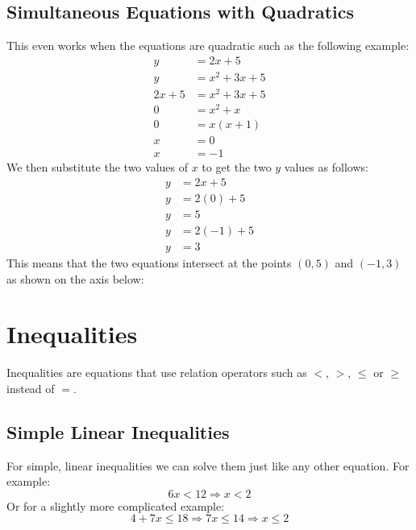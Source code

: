 \documentclass{article}
\begin{document}
\subsection{Simultaneous Equations with Quadratics}
This even works when the equations are quadratic such as the following example:
\begin{align*}
	y &= 2x + 5\\
	y &= x^2 + 3x + 5 \\
	2x + 5 &= x^2 + 3x + 5 \\
	0 &= x^2 + x \\
	0 &= x(x + 1)\\
	x &= 0 \\
	x &= -1
\end{align*}
We then substitute the two values of $x$ to get the two $y$ values as follows:
\begin{align*}
	y &= 2x +5 \\
	y &= 2(0) + 5\\
	y &= 5 \\
	y &= 2(-1) + 5\\
	y &= 3
\end{align*}
This means that the two equations intersect at the points $(0, 5)$ and $(-1, 3)$ as shown on the axis below:

\begin{center}
\end{center}

\section{Inequalities}
Inequalities are equations that use relation operators such as $<$, $>$, $\leq$ or $\geq$ instead of $=$.
\subsection{Simple Linear Inequalities}
For simple, linear inequalities we can solve them just like any other equation. For example:
\begin{equation}
	6x < 12 \Rightarrow x < 2
\end{equation}
Or for a slightly more complicated example:
\begin{equation}
	4 + 7x \leq 18 \Rightarrow 7x \leq 14 \Rightarrow x \leq 2
\end{equation}
\end{document}
